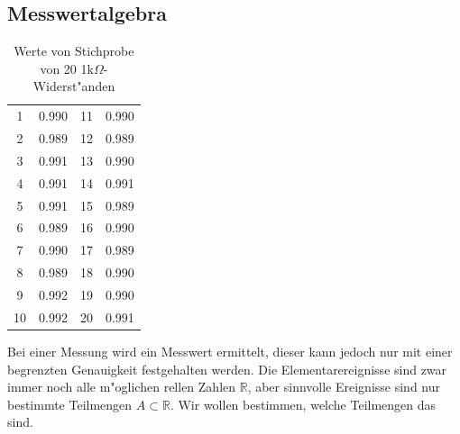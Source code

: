 \subsection{Messwertalgebra}
\begin{table}
\begin{center}
\begin{tabular}{|cc|cc|}
\hline
1&0.990
&11&0.990\\
2&0.989
&12&0.989\\
3&0.991
&13&0.990\\
4&0.991
&14&0.991\\
5&0.991
&15&0.989\\
6&0.989
&16&0.990\\
7&0.990
&17&0.989\\
8&0.989
&18&0.990\\
9&0.992
&19&0.990\\
10&0.992
&20&0.991\\
\hline
\end{tabular}
\end{center}
\caption{Werte von Stichprobe von 20 1k$\Omega$-Widerst"anden\label{widerstandswerte}}
\end{table}
Bei einer Messung wird ein Messwert ermittelt, dieser kann jedoch
nur mit einer begrenzten Genauigkeit festgehalten werden.
Die Elementarereignisse sind zwar immer noch alle m"oglichen rellen
Zahlen $\mathbb R$, aber sinnvolle Ereignisse sind nur bestimmte Teilmengen
$A\subset\mathbb R$. Wir wollen bestimmen, welche Teilmengen das sind.

